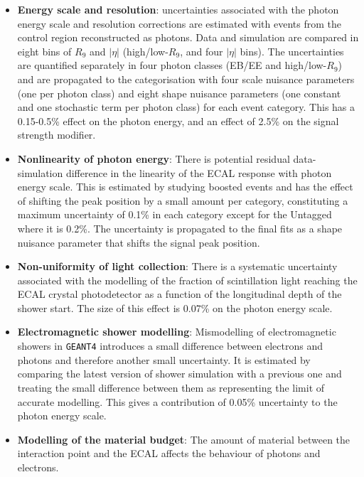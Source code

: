 \begin{itemize}[noitemsep]
    \item {\textbf{Energy scale and resolution}: 
           uncertainties associated with the photon energy scale and resolution corrections
           are estimated with events from the \Zee control region reconstructed as photons. Data and simulation are compared in eight bins of $R_9$ and $|\eta|$ (high/low-$R_9$, and four $|\eta|$ bins). 
           The uncertainties are quantified separately in four photon classes (EB/EE and high/low-$R_9$) and are propagated to the categorisation with four scale nuisance parameters (one per photon class) and eight shape nuisance parameters (one constant and one stochastic term per photon class) for each event category. 
           This has a 0.15-0.5\% effect on the photon energy, and an effect of 2.5\% on the signal strength modifier. 
           }
    \item {\textbf{Nonlinearity of photon energy}: 
          There is potential residual data-simulation difference in the linearity of the ECAL response with photon energy scale. 
          This is estimated by studying boosted \Zee events and has the effect of shifting the peak position by a small amount per category, constituting a maximum uncertainty of 0.1\% in each category except for the Untagged where it is 0.2\%. The uncertainty is propagated to the final fits as a shape nuisance parameter that shifts the signal peak position.
          }
    \item {\textbf{Non-uniformity of light collection}: 
           There is a systematic uncertainty associated with the modelling of the fraction of scintillation light reaching the ECAL crystal photodetector as a function of the longitudinal depth of the shower start. The size of this effect is 0.07\% on the photon energy scale.
           }
    \item {\textbf{Electromagnetic shower modelling}: 
        Mismodelling of electromagnetic showers in \texttt{GEANT4} introduces a small difference between electrons and photons and therefore another small uncertainty. 
           It is estimated by comparing the latest version of shower simulation with a previous one and treating the small difference between them as representing the limit of accurate modelling. 
           This gives a contribution of 0.05\% uncertainty to the photon energy scale.
           }
    \item {\textbf{Modelling of the material budget}: 
           The amount of material between the interaction point and the ECAL affects the behaviour of photons and electrons. 
}
\end{itemize}
